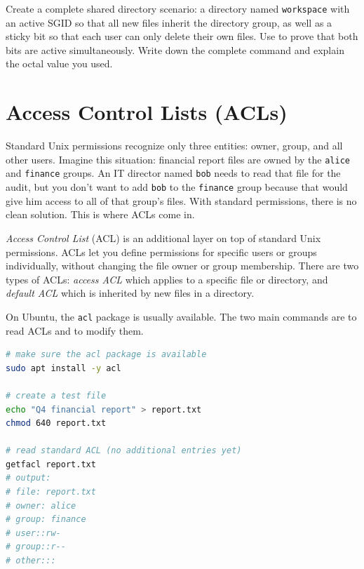 \begin{challengebox}
Create a complete shared directory scenario: a directory named \texttt{workspace} with an active SGID so that all new files inherit the directory group, as well as a sticky bit so that each user can only delete their own files. Use  to prove that both bits are active simultaneously. Write down the complete command and explain the octal value you used.
\end{challengebox}

\section{Access Control Lists (ACLs)}
\label{sec:acls}

Standard Unix permissions recognize only three entities: owner, group, and all other users. Imagine this situation: financial report files are owned by the \texttt{alice} and \texttt{finance} groups. An IT director named \texttt{bob} needs to read that file for the audit, but you don't want to add \texttt{bob} to the \texttt{finance} group because that would give him access to all of that group's files. With standard permissions, there is no clean solution. This is where ACLs come in.

\textit{Access Control List} (ACL) is an additional layer on top of standard Unix permissions. ACLs let you define permissions for specific users or groups individually, without changing the file owner or group membership. There are two types of ACLs: \textit{access ACL} which applies to a specific file or directory, and \textit{default ACL} which is inherited by new files in a directory.

On Ubuntu, the \texttt{acl} package is usually available. The two main commands are  to read ACLs and  to modify them.

\begin{lstlisting}[language=bash, caption={Basic ACL installation and checking}]
# make sure the acl package is available
sudo apt install -y acl

# create a test file
echo "Q4 financial report" > report.txt
chmod 640 report.txt

# read standard ACL (no additional entries yet)
getfacl report.txt
# output:
# file: report.txt
# owner: alice
# group: finance
# user::rw-
# group::r--
# other:::
\end{lstlisting}

